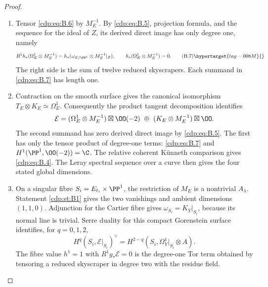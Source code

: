 \begin{proof}
\begin{enumerate}[label={$\langle1\rangle$\arabic*.},leftmargin=*]
\item Tensor \eqref{cdp:eq:B.6} by $M_E^{-1}$. By \eqref{cdp:eq:B.5}, projection formula, and the sequence for the ideal of $Z$, its derived direct image has only degree one, namely
\[
 R^1h_*(\Omega^1_E\otimes M_E^{-1})
 =h_*(\omega_{E/\PP^1}\otimes M_E^{-1}|_Z),
 \qquad h_*(\Omega^1_E\otimes M_E^{-1})=0.             \tag{B.7}\hypertarget{tag-008M}{}\label{cdp:eq:B.7}
\]
The right side is the sum of twelve reduced skyscrapers. Each summand in \eqref{cdp:eq:B.7} has length one.

\item Contraction on the smooth surface gives the canonical isomorphism $T_E\otimes K_E\simeq\Omega^1_E$. Consequently the product tangent decomposition identifies
\[
\mathcal E=(\Omega^1_E\otimes M_E^{-1})\boxtimes\OO(-2)
 \ \oplus\ (K_E\otimes M_E^{-1})\boxtimes\OO.
\]
The second summand has zero derived direct image by \eqref{cdp:eq:B.5}. The first has only the tensor product of degree-one terms: \eqref{cdp:eq:B.7} and $H^1(\PP^1,\OO(-2))=\C$. The relative coherent K\"unneth comparison gives \eqref{cdp:eq:B.4}. The Leray spectral sequence over a curve then gives the four stated global dimensions.

\item On a singular fibre $S_i=E_{t_i}\times\PP^1$, the restriction of $M_E$ is a nontrivial $A_\lambda$. Statement \ref{cdp:st:B1} gives the two vanishings and ambient dimensions $(1,1,0)$. Adjunction for the Cartier fibre gives $\omega_{S_i}=K_Y|_{S_i}$, because its normal line is trivial. Serre duality for this compact Gorenstein surface identifies, for $q=0,1,2$,
\[
 H^q(S_i,\mathcal E|_{S_i})^\vee
 =H^{2-q}(S_i,\Omega_Y^1|_{S_i}\otimes A).
\]
The fibre value $h^1=1$ with $R^1g_*\mathcal E=0$ is the degree-one Tor term obtained by tensoring a reduced skyscraper in degree two with the residue field.

\end{enumerate}
\end{proof}